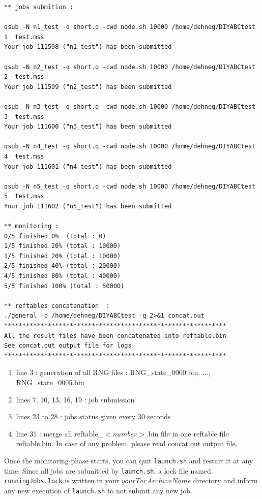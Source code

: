\begin{minipage}{0.99\textwidth}
\begin{lstlisting}
** jobs submition :

qsub -N n1_test -q short.q -cwd node.sh 10000 /home/dehneg/DIYABCtest 1  test.mss
Your job 111598 ("n1_test") has been submitted

qsub -N n2_test -q short.q -cwd node.sh 10000 /home/dehneg/DIYABCtest 2  test.mss
Your job 111599 ("n2_test") has been submitted

qsub -N n3_test -q short.q -cwd node.sh 10000 /home/dehneg/DIYABCtest 3  test.mss
Your job 111600 ("n3_test") has been submitted

qsub -N n4_test -q short.q -cwd node.sh 10000 /home/dehneg/DIYABCtest 4  test.mss
Your job 111601 ("n4_test") has been submitted

qsub -N n5_test -q short.q -cwd node.sh 10000 /home/dehneg/DIYABCtest 5  test.mss
Your job 111602 ("n5_test") has been submitted

** monitoring :
0/5 finished 0%  (total : 0)
1/5 finished 20% (total : 10000)
1/5 finished 20% (total : 10000)
2/5 finished 40% (total : 20000)
4/5 finished 80% (total : 40000)
5/5 finished 100% (total : 50000)

** reftables concatenation  :
./general -p /home/dehneg/DIYABCtest -q 2>&1 concat.out
*************************************************************
All the result files have been concatenated into reftable.bin
See concat.out output file for logs
*************************************************************
\end{lstlisting}
   \end{minipage}
\begin{enumerate}
    \item line 3 : generation of all RNG files : \textsf{RNG\_state\_0000.bin}, ..., \textsf{RNG\_state\_0005.bin}
    \item lines 7, 10, 13, 16, 19 : job submission 
    \item lines 23 to 28 : jobs status given every 30 seconds
    \item line 31 : merge all \textsf{reftable\_$<number>$.bin} file in one reftable file \textsf{reftable.bin}. In case of any problem, please read \textsf{concat.out} output file.
\end{enumerate}
Once the monitoring phase starts, you can quit \texttt{launch.sh} and restart it at any time. Since all jobs are submitted by \texttt{launch.sh}, a lock file named \texttt{runningJobs.lock} is written in your $yourTarArchiveName$ directory and inform any new execution of \texttt{launch.sh} to not submit any new job.

